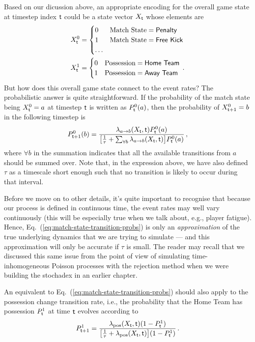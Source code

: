 Based on our dicussion above, an appropriate encoding for the overall game state at timestep index ${\sf t}$ could be a state vector $X_{{\sf t}}$ whose elements are
\begin{align}
X^0_{{\sf t}}&=\begin{cases} 0 & \text{Match State} = \text{{\sf Penalty}}\\ 1 & \text{Match State} = \text{{\sf Free Kick}} \\ \dots & \end{cases} \\
X^1_{{\sf t}}&=\begin{cases} 0 & \text{Possession} = \text{{\sf Home Team}}\\ 1 & \text{Possession} = \text{{\sf Away Team}} \end{cases} \,.
\end{align}
But how does this overall game state connect to the event rates? The probabilistic answer is quite straightforward. If the probability of the match state being $X^0_{{\sf t}}=a$ at timestep ${\sf t}$ is written as $P^0_{{\sf t}}(a)$, then the probability of $X^0_{{\sf t}+1}=b$ in the following timestep is
\begin{align}
P^0_{{\sf t}+1}(b) = \frac{\lambda_{a\rightarrow b} (X_{\sf t}, {\sf t})P^0_{{\sf t}}(a)}{\big[ \frac{1}{\tau} + \sum_{\forall b}\lambda_{a\rightarrow b} (X_{\sf t}, {\sf t})\big] P^0_{{\sf t}}(a)} \label{eq:match-state-transition-probs}\,,
\end{align}
where $\forall b$ in the summation indicates that all the available transitions from $a$ should be summed over. Note that, in the expression above, we have also defined $\tau$ as a timescale short enough such that no transition is likely to occur during that interval. 

Before we move on to other details, it's quite important to recognise that because our process is defined in continuous time, the event rates may well vary continuously (this will be especially true when we talk about, e.g., player fatigue). Hence, Eq.~(\ref{eq:match-state-transition-probs}) is only an \emph{approximation} of the true underlying dynamics that we are trying to simulate --- and this approximation will only be accurate if $\tau$ is small. The reader may recall that we discussed this same issue from the point of view of simulating time-inhomogeneous Poisson processes with the rejection method when we were building the stochadex in an earlier chapter. 

An equivalent to Eq.~(\ref{eq:match-state-transition-probs}) should also apply to the possession change transition rate, i.e., the probability that the {\sf Home Team} has possession $P^1_{{\sf t}}$ at time ${\sf t}$ evolves according to
\begin{align}
P^1_{{\sf t}+1} = \frac{\lambda_{\rm pos} (X_{\sf t}, {\sf t})(1-P^1_{{\sf t}})}{\big[ \frac{1}{\tau} + \lambda_{\rm pos} (X_{\sf t}, {\sf t})\big] (1-P^1_{{\sf t}})} \label{eq:possession-change-probs}\,.
\end{align}

